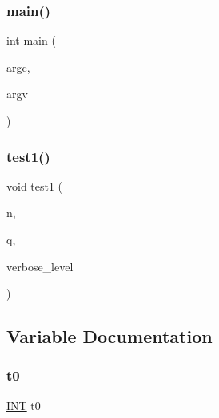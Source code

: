 \subsubsection{\texorpdfstring{main()}{main()}}
{\footnotesize\ttfamily int main (\begin{DoxyParamCaption}\item[{int}]{argc,  }\item[{char $\ast$$\ast$}]{argv }\end{DoxyParamCaption})}

\mbox{\label{test___p_g_8_c_ae2a201e46836d85cb2c5579a837b641a}} 
\subsubsection{\texorpdfstring{test1()}{test1()}}
{\footnotesize\ttfamily void test1 (\begin{DoxyParamCaption}\item[{\mbox{\hyperlink{galois_8h_a09fddde158a3a20bd2dcadb609de11dc}{I\+NT}}}]{n,  }\item[{\mbox{\hyperlink{galois_8h_a09fddde158a3a20bd2dcadb609de11dc}{I\+NT}}}]{q,  }\item[{\mbox{\hyperlink{galois_8h_a09fddde158a3a20bd2dcadb609de11dc}{I\+NT}}}]{verbose\+\_\+level }\end{DoxyParamCaption})}



\subsection{Variable Documentation}
\mbox{\label{test___p_g_8_c_a4268f4fe222ffb119218a0199f5e1904}} 
\subsubsection{\texorpdfstring{t0}{t0}}
{\footnotesize\ttfamily \mbox{\hyperlink{galois_8h_a09fddde158a3a20bd2dcadb609de11dc}{I\+NT}} t0}


